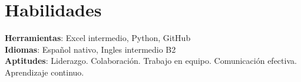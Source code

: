 \documentclass[letterpaper,11pt]{article}
\newcommand{\resumeItem}[1]{
  \item\small{
    {#1 \vspace{-2pt}}
  }
}
\newcommand{\resumeSubHeadingListStart}{\begin{itemize}[leftmargin=0.0in, label={}]}
\newcommand{\resumeSubHeadingListEnd}{\end{itemize}}
\newcommand{\resumeItemListStart}{\begin{itemize}}
\newcommand{\resumeItemListEnd}{\end{itemize}\vspace{-5pt}}
\begin{document}
\section{Habilidades}
 \begin{itemize}[leftmargin=0.15in, label={}]
    \small{\item{
     \textbf{Herramientas}{: Excel intermedio, Python, GitHub} \\
     \textbf{Idiomas}{: Español nativo, Ingles intermedio B2} \\
     \textbf{Aptitudes}{: Liderazgo. Colaboración. Trabajo en equipo. Comunicación efectiva. Aprendizaje continuo. } \\
    }}
 \end{itemize}
 \vspace{-16pt}

\iffalse
\section{Extracurricular}
    \resumeSubHeadingListStart
            \resumeItemListStart
                \resumeItem{Achieved a 4 star fraternity ranking by the Office of Fraternity and Sorority Affairs (highest possible ranking).}
            \resumeItemListEnd
        
    \resumeSubHeadingListEnd

\fi
\end{document}

